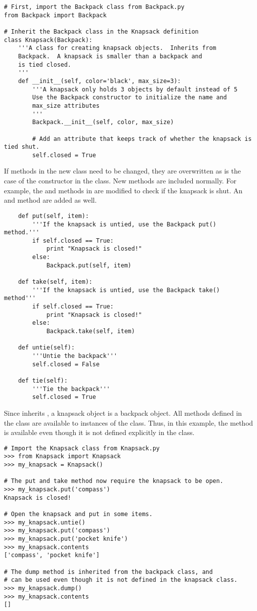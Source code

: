 \begin{lstlisting}
# First, import the Backpack class from Backpack.py
from Backpack import Backpack

# Inherit the Backpack class in the Knapsack definition
class Knapsack(Backpack):
	'''A class for creating knapsack objects.  Inherits from
	Backpack.  A knapsack is smaller than a backpack and
	is tied closed.
	'''
	def __init__(self, color='black', max_size=3):
		'''A knapsack only holds 3 objects by default instead of 5
		Use the Backpack constructor to initialize the name and 
		max_size attributes
		'''
		Backpack.__init__(self, color, max_size)

		# Add an attribute that keeps track of whether the knapsack is tied shut.
		self.closed = True
\end{lstlisting}

If methods in the new class need to be changed, they are overwritten as is the case of the constructor in the  class.
New methods are included normally.
For example, the  and  methods in  are modified to check if the knapsack is shut. 
An  and  method are added as well.

\begin{lstlisting}
	def put(self, item):
		'''If the knapsack is untied, use the Backpack put() method.'''		
		if self.closed == True:
			print "Knapsack is closed!"
		else:
			Backpack.put(self, item)

	def take(self, item):
		'''If the knapsack is untied, use the Backpack take() method'''
		if self.closed == True:
			print "Knapsack is closed!"
		else:
			Backpack.take(self, item)

	def untie(self):
		'''Untie the backpack'''
		self.closed = False

	def tie(self):
		'''Tie the backpack'''
		self.closed = True

\end{lstlisting}

Since  inherits , a knapsack object is a backpack object.
All methods defined in the  class are available to instances of the  class.
Thus, in this example, the  method is available even though it is not defined explicitly in the  class.

\begin{lstlisting}
# Import the Knapsack class from Knapsack.py
>>> from Knapsack import Knapsack
>>> my_knapsack = Knapsack()

# The put and take method now require the knapsack to be open.
>>> my_knapsack.put('compass')
Knapsack is closed!

# Open the knapsack and put in some items.
>>> my_knapsack.untie()
>>> my_knapsack.put('compass')
>>> my_knapsack.put('pocket knife')
>>> my_knapsack.contents
['compass', 'pocket knife']

# The dump method is inherited from the backpack class, and
# can be used even though it is not defined in the knapsack class.
>>> my_knapsack.dump()
>>> my_knapsack.contents
[]
\end{lstlisting}

